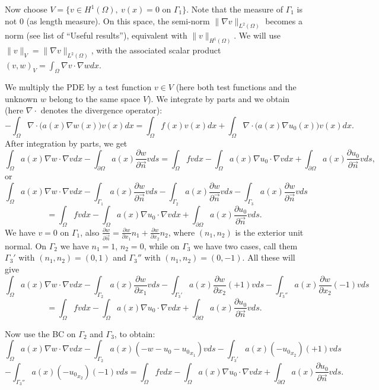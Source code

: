 \documentclass[12pt]{article}
\begin{document}
Now choose $V=\{v\in H^1(\Omega),\ v(x)=0\mbox{ on }\Gamma_1\}$. Note that the measure of $\Gamma_1$ is not 0 (as length measure). On this space, the semi-norm $\|\nabla v\|_{L^2(\Omega)}$ becomes a norm (see list of ``Useful results''), equivalent with $\|v\|_{H^1(\Omega)}$. We will use $\|v\|_{V}=\|\nabla v\|_{L^2(\Omega)}$, with the associated scalar product $(v,w)_{V}=\int_{\Omega}\nabla v\cdot\nabla wdx$. 

We multiply the PDE by a test function $v\in V$ (here both test functions and the unknown $w$ belong to the same space $V$). We integrate by parts and we obtain (here $\nabla\cdot$ denotes the divergence operator): 
$$-\int_{\Omega}\nabla\cdot\Big(a(x)\nabla w(x)\Big)v(x)dx=\int_{\Omega}f(x)v(x)dx+\int_{\Omega}\nabla\cdot\Big(a(x)\nabla u_0(x)\Big)v(x)dx.$$
After integration by parts, we get 
$$\int_{\Omega}a(x)\nabla w\cdot\nabla vdx-\int_{\partial\Omega}a(x)\frac{\partial w}{\partial \vec{n}}vds=\int_{\Omega}fvdx -\int_{\Omega}a(x)\nabla u_0\cdot\nabla vdx+\int_{\partial\Omega}a(x)\frac{\partial u_0}{\partial \vec{n}}vds,$$
or
$$\int_{\Omega}a(x)\nabla w\cdot\nabla vdx-\int_{\Gamma_1}a(x)\frac{\partial w}{\partial \vec{n}}vds-\int_{\Gamma_2}a(x)\frac{\partial w}{\partial \vec{n}}vds-\int_{\Gamma_3}a(x)\frac{\partial w}{\partial \vec{n}}vds$$
$$=\int_{\Omega}fvdx -\int_{\Omega}a(x)\nabla u_0\cdot\nabla vdx+\int_{\partial\Omega}a(x)\frac{\partial u_0}{\partial \vec{n}}vds.$$
We have $v=0$ on $\Gamma_1$, also $\frac{\partial w}{\partial \vec{n}}=\frac{\partial w}{\partial x_1}n_1+\frac{\partial w}{\partial x_2}n_2$, where $(n_1,n_2)$ is the exterior unit normal. On $\Gamma_2$ we have $n_1=1$, $n_2=0$, while on 
$\Gamma_3$ we have two cases, call them $\Gamma_3'$ with $(n_1,n_2)=(0,1)$ and 
$\Gamma_3''$ with $(n_1,n_2)=(0,-1)$. All these will give 
$$\int_{\Omega}a(x)\nabla w\cdot\nabla vdx-\int_{\Gamma_2}a(x)\frac{\partial w}{\partial x_1}vds-\int_{\Gamma_3'}a(x)\frac{\partial w}{\partial x_2}(+1)vds
-\int_{\Gamma_3''}a(x)\frac{\partial w}{\partial x_2}(-1)vds$$
$$=\int_{\Omega}fvdx -\int_{\Omega}a(x)\nabla u_0\cdot\nabla vdx+\int_{\partial\Omega}a(x)\frac{\partial u_0}{\partial \vec{n}}vds.$$

Now use the BC on $\Gamma_2$ and $\Gamma_3$, to obtain: 
$$\int_{\Omega}a(x)\nabla w\cdot\nabla vdx
-\int_{\Gamma_2}a(x)(-w-u_0-{u_0}_{x_1})vds
-\int_{\Gamma_3'}a(x)(-{u_0}_{x_2})(+1)vds$$
$$-\int_{\Gamma_3''}a(x)(-{u_0}_{x_2})(-1)vds
=\int_{\Omega}fvdx -\int_{\Omega}a(x)\nabla u_0\cdot\nabla vdx+\int_{\partial\Omega}a(x)\frac{\partial u_0}{\partial \vec{n}}vds.$$
\end{document}
